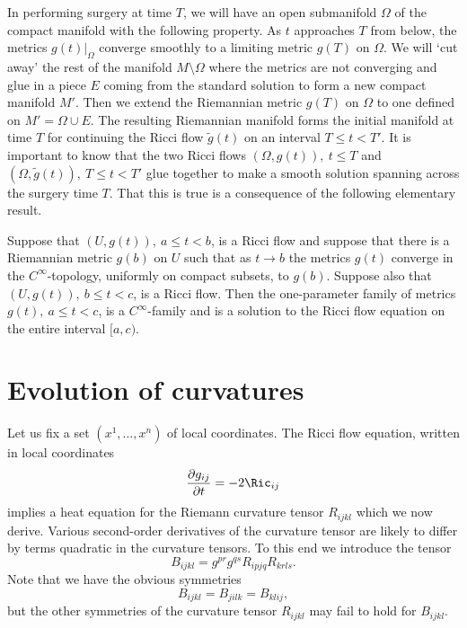 In performing surgery at time $T$, we will have an open submanifold $\Omega$ of
the compact manifold with the following property.  As $t$ approaches $T$ from
below, the metrics $g(t)|_\Omega$ converge smoothly to a limiting metric $g(T)$
on $\Omega$. We will `cut away' the rest of the manifold $M\setminus \Omega$
where the metrics are not converging and glue in a piece $E$ coming from the
standard solution to form a new compact manifold $M'$. Then we extend the
Riemannian metric $g(T)$ on $\Omega$ to one defined on $M'=\Omega\cup E$. The
resulting Riemannian manifold forms the initial manifold at time $T$ for
continuing the Ricci flow $\tilde g(t)$ on an interval $T\le t<T'$. It is
important to know that the two Ricci flows $(\Omega,g(t)),\ t\le T$ and
$(\Omega, \tilde g(t)),\ T\le t<T'$ glue together to make a smooth solution
spanning across the surgery time $T$. That this is true is a consequence of the
following elementary result.

\begin{proposition}\label{prop:smooth-patching}
\label{patch}
 Suppose that $(U,g(t)),\ a\le t<b$, is a Ricci flow and suppose that
 there is a Riemannian metric $g(b)$ on $U$ such that
 as $t\rightarrow b$ the metrics $g(t)$ converge in the $C^\infty$-topology, uniformly
 on compact subsets, to $g(b)$. Suppose also that $(U,g(t)),\ b\le t<c$, is a
 Ricci flow. Then the one-parameter family of metrics $g(t), \ a\le
 t<c$, is a $C^\infty$-family and is a solution to the Ricci flow
 equation on the entire interval $[a,c)$.
 \end{proposition}


\section{Evolution of curvatures}\label{evolcurv}


Let us fix a set
$(x^1,\ldots,x^n)$ of local coordinates. The Ricci flow equation,
written in local coordinates
\[ \frac{\partial g_{ij}}{\partial t} =
-2\Ric_{ij}
\]  implies a heat equation for the Riemann
curvature tensor $R_{ijkl}$ which we now derive. Various second-order
derivatives of the curvature tensor are likely to differ by
terms quadratic in the curvature tensors. To this end we introduce
the tensor $$B_{ijkl} = g^{pr}g^{qs}R_{ipjq}R_{krls}.$$ Note that we
have the obvious symmetries
$$B_{ijkl} = B_{jilk} = B_{klij},$$ but the other symmetries of
the curvature tensor $R_{ijkl}$ may fail to hold for $B_{ijkl}$.

